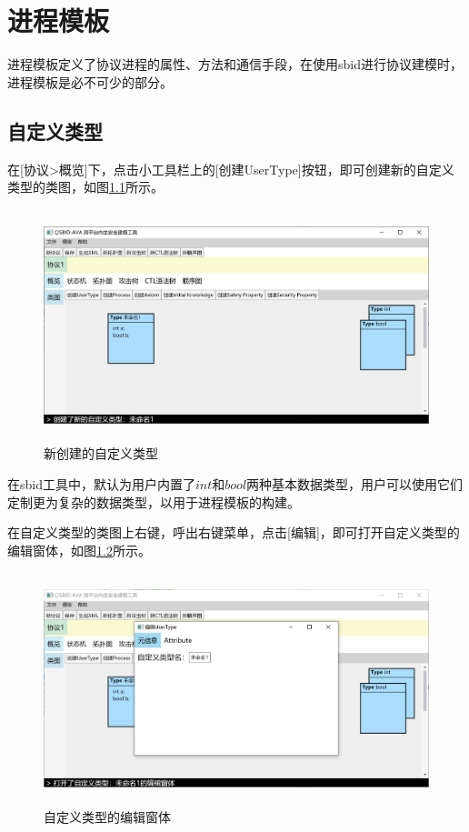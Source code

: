 \chapter{进程模板}

进程模板定义了协议进程的属性、方法和通信手段，在使用sbid进行协议建模时，进程模板是必不可少的部分。

\section{自定义类型}
在[协议>概览]下，点击小工具栏上的[创建UserType]按钮，即可创建新的自定义类型的类图，如图\ref{usertype}所示。
    \begin{figure}[h]
	\centering
	\includegraphics[width=12cm,height=6.75cm]{imgs/usertype.png}
	\caption{新创建的自定义类型}
	\label{usertype}
	\end{figure}
\par
在sbid工具中，默认为用户内置了$int$和$bool$两种基本数据类型，用户可以使用它们定制更为复杂的数据类型，以用于进程模板的构建。
\par
在自定义类型的类图上右键，呼出右键菜单，点击[编辑]，即可打开自定义类型的编辑窗体，如图\ref{usertype_edit_window}所示。
\begin{figure}[h]
	\centering
	\includegraphics[width=12cm,height=6.75cm]{imgs/usertype_edit_window.png}
	\caption{自定义类型的编辑窗体}
	\label{usertype_edit_window}
\end{figure}
